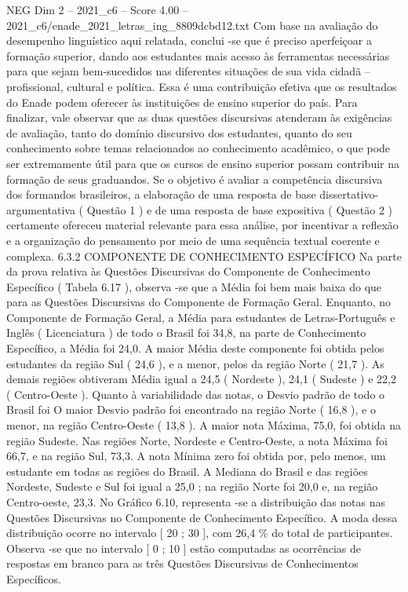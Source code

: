\begin{textsample}{NEG Dim 2 – 2021\_c6 – Score 4.00 – 2021\_c6/enade\_2021\_letras\_ing\_8809dcbd12.txt}
Com base na avaliação do desempenho linguístico aqui relatada, conclui -se que é preciso aperfeiçoar a formação superior, dando aos estudantes mais acesso às ferramentas necessárias para que sejam bem-sucedidos nas diferentes situações de sua vida cidadã – profissional, cultural e política.
Essa é uma contribuição efetiva que os resultados do Enade podem oferecer às instituições de ensino superior do país.
Para finalizar, vale observar que as duas questões discursivas atenderam às exigências de avaliação, tanto do domínio discursivo dos estudantes, quanto do seu conhecimento sobre temas relacionados ao conhecimento acadêmico, o que pode ser extremamente útil para que os cursos de ensino superior possam contribuir na formação de seus graduandos.
Se o objetivo é avaliar a competência discursiva dos formandos brasileiros, a elaboração de uma resposta de base dissertativo-argumentativa ( Questão 1 ) e de uma resposta de base expositiva ( Questão 2 ) certamente ofereceu material relevante para essa análise, por incentivar a reflexão e a organização do pensamento por meio de uma sequência textual coerente e complexa. 6.3.2 COMPONENTE DE CONHECIMENTO ESPECÍFICO Na parte da prova relativa às Questões Discursivas do Componente de Conhecimento Específico ( Tabela 6.17 ), observa -se que a Média foi bem mais baixa do que para as Questões Discursivas do Componente de Formação Geral.
Enquanto, no Componente de Formação Geral, a Média para estudantes de Letras-Português e Inglês ( Licenciatura ) de todo o Brasil foi 34,8, na parte de Conhecimento Específico, a Média foi 24,0.
A maior Média deste componente foi obtida pelos estudantes da região Sul ( 24,6 ), e a menor, pelos da região Norte ( 21,7 ).
As demais regiões obtiveram Média igual a 24,5 ( Nordeste ), 24,1 ( Sudeste ) e 22,2 ( Centro-Oeste ).
Quanto à variabilidade das notas, o Desvio padrão de todo o Brasil foi O maior Desvio padrão foi encontrado na região Norte ( 16,8 ), e o menor, na região Centro-Oeste ( 13,8 ).
A maior nota Máxima, 75,0, foi obtida na região Sudeste.
Nas regiões Norte, Nordeste e Centro-Oeste, a nota Máxima foi 66,7, e na região Sul, 73,3.
A nota Mínima zero foi obtida por, pelo menos, um estudante em todas as regiões do Brasil.
A Mediana do Brasil e das regiões Nordeste, Sudeste e Sul foi igual a 25,0 ; na região Norte foi 20,0 e, na região Centro-oeste, 23,3.
No Gráfico 6.10, representa -se a distribuição das notas nas Questões Discursivas no Componente de Conhecimento Específico.
A moda dessa distribuição ocorre no intervalo [ 20 ; 30 ], com 26,4 \% do total de participantes.
Observa -se que no intervalo [ 0 ; 10 ] estão computadas as ocorrências de respostas em branco para as três Questões Discursivas de Conhecimentos Específicos.

\end{textsample}
